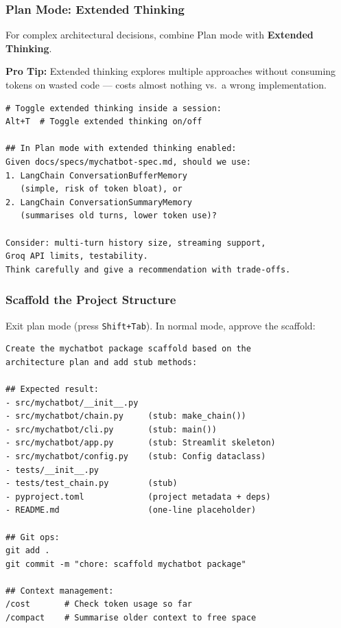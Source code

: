 \begin{frame}[fragile]\frametitle{Plan Mode: Extended Thinking}
For complex architectural decisions, combine Plan mode with \textbf{Extended Thinking}.

\textbf{Pro Tip:} Extended thinking explores multiple approaches without consuming tokens on wasted code --- costs almost nothing vs.\ a wrong implementation.

\begin{lstlisting}
# Toggle extended thinking inside a session:
Alt+T  # Toggle extended thinking on/off

## In Plan mode with extended thinking enabled:
Given docs/specs/mychatbot-spec.md, should we use:
1. LangChain ConversationBufferMemory
   (simple, risk of token bloat), or
2. LangChain ConversationSummaryMemory
   (summarises old turns, lower token use)?

Consider: multi-turn history size, streaming support,
Groq API limits, testability.
Think carefully and give a recommendation with trade-offs.
\end{lstlisting}

\end{frame}


\begin{frame}[fragile]\frametitle{Scaffold the Project Structure}
Exit plan mode (press \texttt{Shift+Tab}). In normal mode, approve the scaffold:

\begin{lstlisting}
Create the mychatbot package scaffold based on the
architecture plan and add stub methods:

## Expected result:
- src/mychatbot/__init__.py
- src/mychatbot/chain.py     (stub: make_chain())
- src/mychatbot/cli.py       (stub: main())
- src/mychatbot/app.py       (stub: Streamlit skeleton)
- src/mychatbot/config.py    (stub: Config dataclass)
- tests/__init__.py
- tests/test_chain.py        (stub)
- pyproject.toml             (project metadata + deps)
- README.md                  (one-line placeholder)

## Git ops:
git add .
git commit -m "chore: scaffold mychatbot package"

## Context management:
/cost       # Check token usage so far
/compact    # Summarise older context to free space
\end{lstlisting}
\end{frame}


